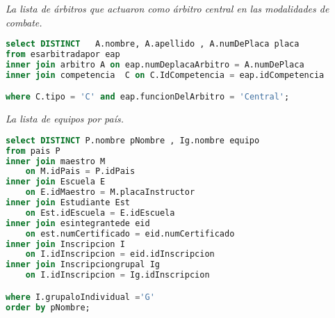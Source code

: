 \emph{La lista de árbitros que actuaron como árbitro central en las modalidades de combate.}
\begin{lstlisting}[language=SQL]
select DISTINCT   A.nombre, A.apellido , A.numDePlaca placa
from esarbitradapor eap
inner join arbitro A on eap.numDeplacaArbitro = A.numDePlaca
inner join competencia  C on C.IdCompetencia = eap.idCompetencia

where C.tipo = 'C' and eap.funcionDelArbitro = 'Central';
\end{lstlisting}


\emph{La lista de equipos por país.}
\begin{lstlisting}[language=SQL]
select DISTINCT P.nombre pNombre , Ig.nombre equipo
from pais P
inner join maestro M
    on M.idPais = P.idPais
inner join Escuela E
    on E.idMaestro = M.placaInstructor
inner join Estudiante Est
    on Est.idEscuela = E.idEscuela
inner join esintegrantede eid
    on est.numCertificado = eid.numCertificado
inner join Inscripcion I
    on I.idInscripcion = eid.idInscripcion
inner join Inscripciongrupal Ig
    on I.idInscripcion = Ig.idInscripcion

where I.grupaloIndividual ='G'
order by pNombre;
\end{lstlisting}
